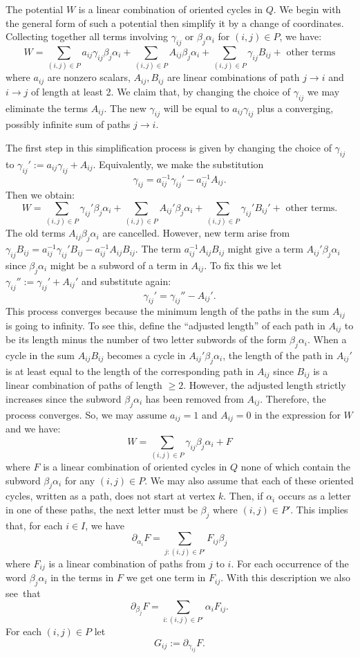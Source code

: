 \documentclass[ALCO,ThmDefs,Unicode,epreuves]{cedram}
\begin{document}
The potential $W$ is a linear combination of oriented cycles in $Q$. We begin with the general form of such a potential then simplify it by a change of coordinates. Collecting together all terms involving $\gamma_{ij}$ or $\beta_j\alpha_i$ for $(i,j)\in P$, we have:
\[
	W=\sum_{(i,j)\in P}a_{ij}\gamma_{ij}\beta_j\alpha_i+\sum_{(i,j)\in P}A_{ij}\beta_j\alpha_i+\sum_{(i,j)\in P}\gamma_{ij}B_{ij}+ \text{ other terms}
\]
where $a_{ij}$ are nonzero scalars, $A_{ij},B_{ij}$ are linear combinations of path $j\to i$ and $i\to j$ of length at least 2. We claim that, by changing the choice of $\gamma_{ij}$ we may eliminate the terms $A_{ij}$. The new $\gamma_{ij}$ will be equal to $a_{ij}\gamma_{ij}$ plus a converging, possibly infinite sum of paths $j\to i$.

The first step in this simplification process is given by changing the choice of $\gamma_{ij}$ to $\gamma_{ij}':=a_{ij}\gamma_{ij}+A_{ij}$. Equivalently, we make the substitution 
\[
\gamma_{ij}=a_{ij}^{-1}\gamma_{ij}'-a_{ij}^{-1}A_{ij}.
\]
Then we obtain:
\[
	W=\sum_{(i,j)\in P}\gamma_{ij}'\beta_j\alpha_i+\sum_{(i,j)\in P}A_{ij}'\beta_j\alpha_i+\sum_{(i,j)\in P}\gamma_{ij}'B_{ij}'+ \text{ other terms}.
\]
The old terms $A_{ij}\beta_j\alpha_i$ are cancelled. However, new term arise from $\gamma_{ij}B_{ij}=a_{ij}^{-1}\gamma_{ij}'B_{ij}-a_{ij}^{-1}A_{ij}B_{ij}$. The term $a_{ij}^{-1}A_{ij}B_{ij}$ might give a term $A_{ij}'\beta_j\alpha_i$ since $\beta_j\alpha_i$ might be a subword of a term in $A_{ij}$. To fix this we let $\gamma_{ij}'':=\gamma_{ij}'+A_{ij}'$ and substitute again:
\[
	\gamma_{ij}'=\gamma_{ij}''-A_{ij}'.
\]
This process converges because the minimum length of the paths in the sum $A_{ij}$ is going to infinity. To see this, define the ``adjusted length'' of each path in $A_{ij}$ to be its length minus the number of two letter subwords of the form $\beta_j\alpha_i$. When a cycle in the sum $A_{ij}B_{ij}$ becomes a cycle in $A_{ij}'\beta_j\alpha_i$, the length of the path in $A_{ij}'$ is at least equal to the length of the corresponding path in $A_{ij}$ since $B_{ij}$ is a linear combination of paths of length $\ge2$. However, the adjusted length strictly increases since the subword $\beta_j\alpha_i$ has been removed from $A_{ij}$. Therefore, the process converges. So, we may assume $a_{ij}=1$ and $A_{ij}=0$ in the expression for $W$ and we have:
\[
	W=\sum_{(i,j)\in P}\gamma_{ij}\beta_j\alpha_i+F
\]
where $F$ is a linear combination of oriented cycles in $Q$ none of which contain the subword $\beta_j\alpha_i$ for any $(i,j)\in P$. We may also assume that each of these oriented cycles, written as a path, does not start at vertex $k$. Then, if $\alpha_i$ occurs as a letter in one of these paths, the next letter must be $\beta_{j}$ where $(i,j)\in P'$. This implies that, for each $i\in I$, we have
\[
	\partial_{\alpha_i}F=\sum_{j:(i,j)\in P'} F_{ij}\beta_j
\]
where $F_{ij}$ is a linear combination of paths from $j$ to $i$. For each occurrence of the word $\beta_j\alpha_i$ in the terms in $F$ we get one term in $F_{ij}$. With this description we also see~that
\[
	\partial_{\beta_j}F=\sum_{i:(i,j)\in P'} \alpha_iF_{ij}.
\]
For each $(i,j)\in P$ let
\[
	G_{ij}:=\partial_{\gamma_{ij}}F.
\]
\end{document}
